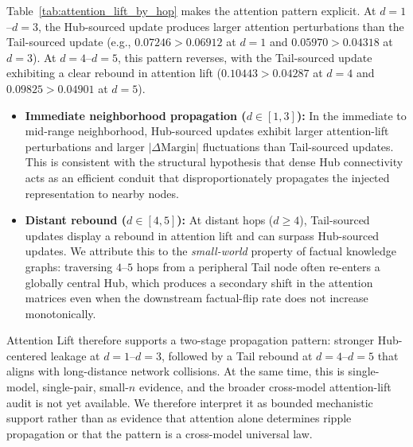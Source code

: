 Table~\ref{tab:attention_lift_by_hop} makes the attention pattern explicit. At $d{=}1$--$d{=}3$, the Hub-sourced update produces larger attention perturbations than the Tail-sourced update (e.g., $0.07246 > 0.06912$ at $d{=}1$ and $0.05970 > 0.04318$ at $d{=}3$). At $d{=}4$--$d{=}5$, this pattern reverses, with the Tail-sourced update exhibiting a clear rebound in attention lift ($0.10443 > 0.04287$ at $d{=}4$ and $0.09825 > 0.04901$ at $d{=}5$).
\begin{itemize}
    \setlength\itemsep{0em}
    \item \textbf{Immediate neighborhood propagation ($d \in [1, 3]$):} In the immediate to mid-range neighborhood, Hub-sourced updates exhibit larger attention-lift perturbations and larger $|\Delta\mathrm{Margin}|$ fluctuations than Tail-sourced updates. This is consistent with the structural hypothesis that dense Hub connectivity acts as an efficient conduit that disproportionately propagates the injected representation to nearby nodes.
    \item \textbf{Distant rebound ($d \in [4, 5]$):} At distant hops ($d \ge 4$), Tail-sourced updates display a rebound in attention lift and can surpass Hub-sourced updates. We attribute this to the \textit{small-world} property of factual knowledge graphs: traversing $4$--$5$ hops from a peripheral Tail node often re-enters a globally central Hub, which produces a secondary shift in the attention matrices even when the downstream factual-flip rate does not increase monotonically.
\end{itemize}
Attention Lift therefore supports a two-stage propagation pattern: stronger Hub-centered leakage at $d{=}1$--$d{=}3$, followed by a Tail rebound at $d{=}4$--$d{=}5$ that aligns with long-distance network collisions. At the same time, this is single-model, single-pair, small-$n$ evidence, and the broader cross-model attention-lift audit is not yet available. We therefore interpret it as bounded mechanistic support rather than as evidence that attention alone determines ripple propagation or that the pattern is a cross-model universal law.
